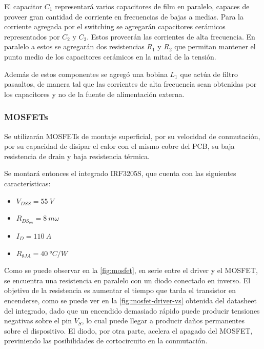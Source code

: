 \documentclass[../et.tex]{subfiles}
\begin{document}
  El capacitor $C_1$ representará varios capacitores de film en paralelo, capaces de proveer gran cantidad de corriente en frecuencias de bajas a medias. Para la corriente agregada por el switching se agregarán capacitores cerámicos representados por $C_2$ y $C_3$. Estos proveerán las corrientes de alta frecuencia. En paralelo a estos se agregarán dos resistencias $R_1$ y $R_2$ que permitan mantener el punto medio de los capacitores cerámicos en la mitad de la tensión.

  Además de estos componentes se agregó una bobina $L_1$ que actúa de filtro pasaaltos, de manera tal que las corrientes de alta frecuencia sean obtenidas por los capacitores y no de la fuente de alimentación externa.


  \subsubsection{MOSFETs}
  Se utilizarán MOSFETs de montaje superficial, por su velocidad de conmutación, por su capacidad de disipar el calor con el mismo cobre del PCB, su baja resistencia de drain y baja resistencia térmica.

  Se montará entonces el integrado IRF3205S, que cuenta con las siguientes características:
    \begin{itemize}
      \item $V_{DSS} = \SI{55}{V}$
        \item $R_{DS_{on}} = \SI{8}{m\omega}$
        \item $I_D = \SI{110}{A}$
        \item $R_{\theta JA} = \SI{40}{\degree C/W}$
    \end{itemize}

  Como se puede observar en la \autoref{fig:mosfet}, en serie entre el driver y el MOSFET, se encuentra una resistencia en paralelo con un diodo conectado en inverso. El objetivo de la resistencia es aumentar el tiempo que tarda el transistor en encenderse, como se puede ver en la \autoref{fig:mosfet-driver-vs} obtenida del datasheet del integrado, dado que un encendido demasiado rápido puede producir tensiones negativas sobre el pin $V_S$, lo cual puede llegar a producir daños permanentes sobre el dispositivo. El diodo, por otra parte, acelera el apagado del MOSFET, previniendo las posibilidades de cortocircuito en la conmutación.
\end{document}
